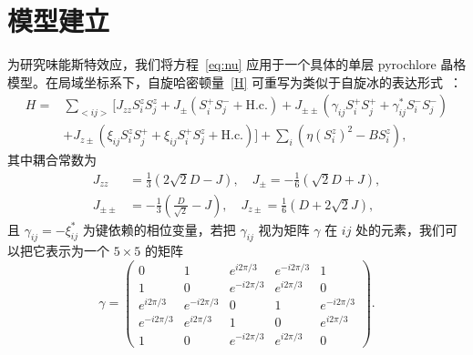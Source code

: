     \section{模型建立}
       为研究味能斯特效应，我们将方程~\eqref{eq:nu} 应用于一个具体的单层 pyrochlore 晶格模型。在局域坐标系下，自旋哈密顿量~\eqref{H} 可重写为类似于自旋冰的表达形式~\cite{ross2011quantum}：
        \begin{align}
            H=&\sum_{<ij>} [J_{zz} S^z_i S^z_j + J_{\pm}(S^+_i S^-_j+\text{H.c.})+ J_{\pm\pm}(\gamma_{ij}S^+_i S^+_j + \gamma^*_{ij}S^-_i S^-_j)\nonumber\\
            &+ J_{z\pm}(\xi_{ij} S^z_iS^+_j + \xi_{ij}S^+_iS^z_j+\text{H.c.})] + \sum_i (\eta(S^z_i)^2 - B S^z_i),
            \label{eq:Full_Ham}
        \end{align}
        其中耦合常数为
        \begin{align}
            J_{zz}&=\frac{1}{3}(2\sqrt{2}D-J),\quad J_\pm=-\frac{1}{6}(\sqrt{2}D+J),\nonumber\\
            J_{\pm\pm}&=-\frac{1}{3}(\frac{D}{\sqrt{2}}-J),\quad J_{z\pm}=\frac{1}{6}(D+2\sqrt{2}J),
        \end{align}
        且 $\gamma_{ij}=-\xi^*_{ij}$ 为键依赖的相位变量，若把 $\gamma_{ij}$ 视为矩阵 $\gamma$ 在 $ij$ 处的元素，我们可以把它表示为一个 $5\times5$ 的矩阵
        \begin{equation}
            \gamma=
            \begin{pmatrix} 
                0               &1                   &e^{i2\pi/3}         &e^{-i2\pi/3}     &1\\
                1               &0                   &e^{-i2\pi/3}        &e^{i2\pi/3}      &0\\
                e^{i2\pi/3}     &e^{-i2\pi/3}        &0                   &1                &e^{-i2\pi/3}\\
                e^{-i2\pi/3}    &e^{i2\pi/3}         &1                   &0                &e^{i2\pi/3}\\
                1               &0                   &e^{-i2\pi/3}        &e^{i2\pi/3}      &0
            \end{pmatrix}.                        
        \end{equation}
        
